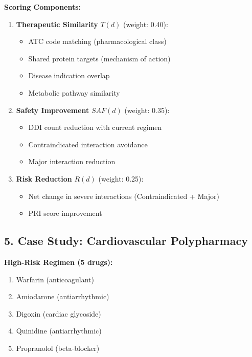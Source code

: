 \documentclass[11pt,a4paper]{article}
\begin{document}
\textbf{Scoring Components:}
\begin{enumerate}[label=(\roman*)]
    \item \textbf{Therapeutic Similarity} $T(d)$ (weight: 0.40):
    \begin{itemize}
        \item ATC code matching (pharmacological class)
        \item Shared protein targets (mechanism of action)
        \item Disease indication overlap
        \item Metabolic pathway similarity
    \end{itemize}
    
    \item \textbf{Safety Improvement} $SAF(d)$ (weight: 0.35):
    \begin{itemize}
        \item DDI count reduction with current regimen
        \item Contraindicated interaction avoidance
        \item Major interaction reduction
    \end{itemize}
    
    \item \textbf{Risk Reduction} $R(d)$ (weight: 0.25):
    \begin{itemize}
        \item Net change in severe interactions (Contraindicated + Major)
        \item PRI score improvement
    \end{itemize}
\end{enumerate}

\subsection*{5. Case Study: Cardiovascular Polypharmacy}

\textbf{High-Risk Regimen (5 drugs):}
\begin{enumerate}[label=(\roman*)]
    \item Warfarin (anticoagulant)
    \item Amiodarone (antiarrhythmic)
    \item Digoxin (cardiac glycoside)
    \item Quinidine (antiarrhythmic)
    \item Propranolol (beta-blocker)
\end{enumerate}
\end{document}
